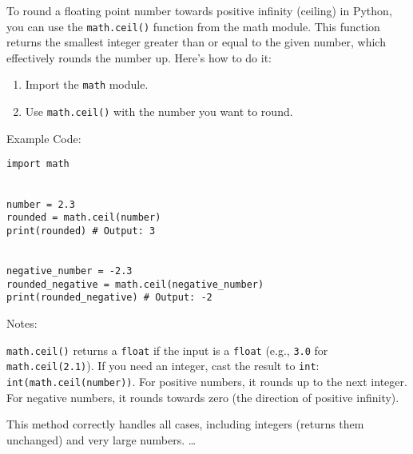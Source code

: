 To round a floating point number towards positive infinity (ceiling) in Python, you can use the \texttt{math.ceil()} function from the math module.
This function returns the smallest integer greater than or equal to the given number, which effectively rounds the number up.
Here's how to do it:%
%
\begin{enumerate}%
\item Import the \texttt{math} module.%
\item Use \texttt{math.ceil()} with the number you want to round.%
\end{enumerate}%
%
Example Code:%
\begin{center}%
\parbox{0.7\linewidth}{%
\texttt{import math}\\%
\strut\\%
\texttt{number = 2.3}\\%
\texttt{rounded = math.ceil(number)}\\%
\texttt{print(rounded)  \# Output: 3}\\%
\strut\\%
\texttt{negative\_number = -2.3}\\%
\texttt{rounded\_negative = math.ceil(negative\_number)}\\%
\texttt{print(rounded\_negative)  \# Output: -2}\\%
}\end{center}%
%
Notes:

\texttt{math.ceil()} returns a \texttt{float} if the input is a \texttt{float} (e.g., \texttt{3.0} for \texttt{math.ceil(2.1)}).
If you need an integer, cast the result to \texttt{int}: \texttt{int(math.ceil(number))}.
For positive numbers, it rounds up to the next integer.
For negative numbers, it rounds towards zero (the direction of positive infinity).

This method correctly handles all cases, including integers (returns them unchanged) and very large numbers.
\dots%
